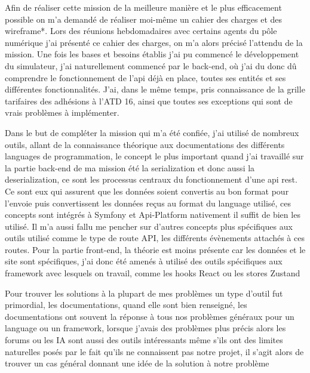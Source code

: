 \documentclass[a4paper,12pt]{report}
\begin{document}
\vspace{1em}

Afin de réaliser cette mission de la meilleure manière et le plus efficacement possible on m'a demandé de réaliser moi-même un cahier des charges et des wireframe*. Lors des réunions hebdomadaires avec certains agents du pôle numérique j'ai présenté ce cahier des charges, on m'a alors précisé l'attendu de la mission. Une fois les bases et besoins établis j'ai pu commencé le développement du simulateur, j'ai naturellement commencé par le back-end, où j'ai du donc dû comprendre le fonctionnement de l'api déjà en place, toutes ses entités et ses différentes fonctionnalités. J'ai, dans le même temps, pris connaissance de la grille tarifaires des adhésions à l'ATD 16, ainsi que toutes ses exceptions qui sont de vrais problèmes à implémenter.

\vspace{1em}

Dans le but de compléter la mission qui m'a été confiée, j'ai utilisé de nombreux outils, allant de la connaissance théorique aux documentations des différents languages de programmation, le concept le plus important quand j'ai travaillé sur la partie back-end de ma mission été la serialization et donc aussi la deserialization, ce sont les processus centraux du fonctionnement d'une api rest. Ce sont eux qui assurent que les données soient convertis au bon format pour l'envoie puis convertissent les données reçus au format du language utilisé, ces concepts sont intégrés à Symfony et Api-Platform nativement il suffit de bien les utilisé. Il m'a aussi fallu me pencher sur d'autres concepts plus spécifiques aux outils utilisé comme le type de route API, les différents évènements attachés à ces routes. Pour la partie front-end, la théorie est moins présente car les données et le site sont spécifiques, j'ai donc été amenés à utilisé des outils spécifiques aux framework avec lesquels on travail, comme les hooks React ou les stores Zustand

\vspace{1em}

Pour trouver les solutions à la plupart de mes problèmes un type d'outil fut primordial, les documentations, quand elle sont bien renseigné, les documentations ont souvent la réponse à tous nos problèmes généraux pour un language ou un framework, lorsque j'avais des problèmes plus précis alors les forums ou les IA sont aussi des outils intéressants même s'ils ont des limites naturelles posés par le fait qu'ils ne connaissent pas notre projet, il s'agit alors de trouver un cas général donnant une idée de la solution à notre problème
\end{document}
